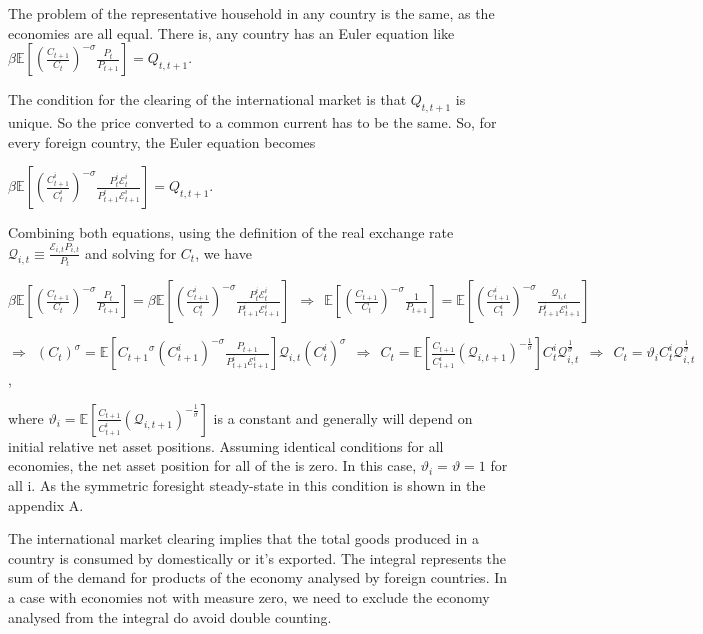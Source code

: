 \documentclass[
]{article}
\begin{document}
The problem of the representative household in any country is the same,
as the economies are all equal. There is, any country has an Euler
equation like
\(\displaystyle \beta \mathbb{E} \left[ \left( \frac{C_{t+1}}{C_t} \right)^{-\sigma} \frac{P_t}{P_{t+1}}\right]= Q_{t,t+1}\).

The condition for the clearing of the international market is that
\(Q_{t,t+1}\) is unique. So the price converted to a common current has
to be the same. So, for every foreign country, the Euler equation
becomes

\(\displaystyle \beta \mathbb{E} \left[ \left( \frac{C_{t+1}^i}{C_t^i} \right)^{-\sigma} \frac{P_t^i \mathcal{E}_t^i}{P_{t+1}^i \mathcal{E}_{t+1}^i}\right] = Q_{t,t+1}\).

Combining both equations, using the definition of the real exchange rate
\(\displaystyle \mathcal{Q}_{i,t} \equiv \frac{\mathcal{E}_{i,t}P_{i,t}}{P_t}\)
and solving for \(C_t\), we have

\(\displaystyle \beta \mathbb{E} \left[ \left( \frac{C_{t+1}}{C_t} \right)^{-\sigma} \frac{P_t}{P_{t+1}}\right] = \beta \mathbb{E} \left[ \left( \frac{C_{t+1}^i}{C_t^i} \right)^{-\sigma} \frac{P_t^i \mathcal{E}_t^i}{P_{t+1}^i \mathcal{E}_{t+1}^i}\right] \ \ \Rightarrow \ \ \mathbb{E} \left[ \left( \frac{C_{t+1}}{C_t} \right)^{-\sigma} \frac{1}{P_{t+1}}\right] = \mathbb{E} \left[ \left( \frac{C_{t+1}^i}{C_t^i} \right)^{-\sigma} \frac{\mathcal{Q}_{i,t}}{P_{t+1}^i \mathcal{E}_{t+1}^i}\right]\)

\(\displaystyle \Rightarrow \ \ (C_t)^\sigma = \mathbb{E} \left[ {C_{t+1}}^\sigma \left( C_{t+1}^i \right)^{-\sigma} \frac{P_{t+1}}{P_{t+1}^i \mathcal{E}_{t+1}^i}\right]\mathcal{Q}_{i,t}(C_t^i)^\sigma \ \ \Rightarrow \ \ C_t = \mathbb{E} \left[ \frac{C_{t+1}}{C_{t+1}^i} (\mathcal{Q}_{i,t+1})^{-\frac{1}{\sigma}}\right] C_t^i \mathcal{Q}_{i,t}^\frac{1}{\sigma} \ \ \Rightarrow \ \ C_t = \vartheta_i C_t^i \mathcal{Q}_{i,t}^\frac{1}{\sigma}\),

where
\(\displaystyle \vartheta_i = \mathbb{E} \left[ \frac{C_{t+1}}{C_{t+1}^i} (\mathcal{Q}_{i,t+1})^{-\frac{1}{\sigma}}\right]\)
is a constant and generally will depend on initial relative net asset
positions. Assuming identical conditions for all economies, the net
asset position for all of the is zero. In this case,
\(\vartheta_i = \vartheta = 1\) for all i. As the symmetric foresight
steady-state in this condition is shown in the appendix A.

The international market clearing implies that the total goods produced
in a country is consumed by domestically or it's exported. The integral
represents the sum of the demand for products of the economy analysed by
foreign countries. In a case with economies not with measure zero, we
need to exclude the economy analysed from the integral do avoid double
counting.
\end{document}
